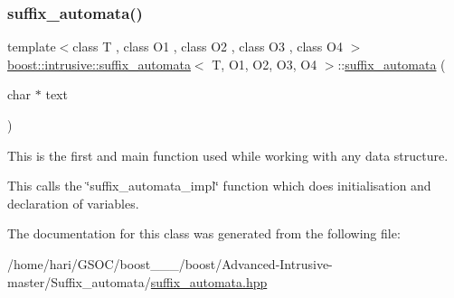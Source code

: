 \subsubsection{\texorpdfstring{suffix\+\_\+automata()}{suffix\_automata()}}
{\footnotesize\ttfamily template$<$class T , class O1 , class O2 , class O3 , class O4 $>$ \\
\hyperlink{classboost_1_1intrusive_1_1suffix__automata}{boost\+::intrusive\+::suffix\+\_\+automata}$<$ T, O1, O2, O3, O4 $>$\+::\hyperlink{classboost_1_1intrusive_1_1suffix__automata}{suffix\+\_\+automata} (\begin{DoxyParamCaption}\item[{char $\ast$}]{text }\end{DoxyParamCaption})\hspace{0.3cm}{\ttfamily [inline]}}


\begin{DoxyItemize}
\item This is the first and main function used while working with any data structure. 
\item This calls the \char`\"{}suffix\+\_\+automata\+\_\+impl\char`\"{} function which does initialisation and declaration of variables. 
\end{DoxyItemize}

The documentation for this class was generated from the following file\+:\begin{DoxyCompactItemize}
\item 
/home/hari/\+G\+S\+O\+C/boost\+\_\+\_\+\_/boost/\+Advanced-\/\+Intrusive-\/master/\+Suffix\+\_\+automata/\hyperlink{suffix__automata_8hpp}{suffix\+\_\+automata.\+hpp}\end{DoxyCompactItemize}
